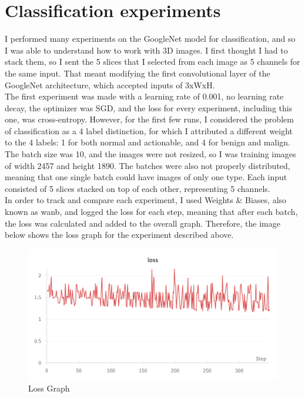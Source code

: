 \section{Classification experiments}
I performed many experiments on the GoogleNet model for classification, and so I was able to understand how to work with 3D images. I first thought I had to stack them, so I sent the 5 slices that I selected from each image as 5 channels for the same input. That meant modifying the first convolutional layer of the GoogleNet architecture, which accepted inputs of 3xWxH.\\
The first experiment was made with a learning rate of 0.001, no learning rate decay, the optimizer was SGD, and the loss for every experiment, including this one, was cross-entropy. However, for the first few runs, I considered the problem of classification as a 4 label distinction, for which I attributed a different weight to the 4 labels: 1 for both normal and actionable, and 4 for benign and malign. The batch size was 10, and the images were not resized, so I was training images of width 2457 and height 1890. The batches were also not properly distributed, meaning that one single batch could have images of only one type. Each input consisted of 5 slices stacked on top of each other, representing 5 channels.\\
In order to track and compare each experiment, I used Weights \& Biases, also known as wanb, and logged the loss for each step, meaning that after each batch, the loss was calculated and added to the overall graph. Therefore, the image below shows the loss graph for the experiment described above.\\
\begin{figure}[ht!]
    \centering
    \includegraphics[width=1\textwidth]{figures/Figure8.png}
    \caption{Loss Graph}
    \label{fig:fig8}
\end{figure}
